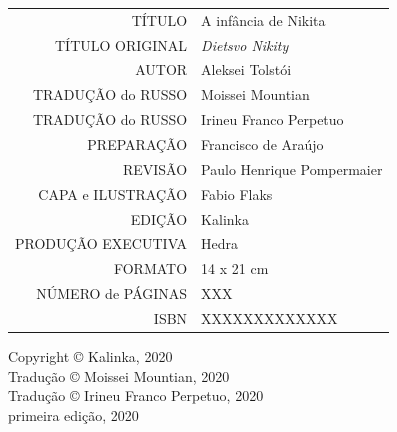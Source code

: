 {\begin{vplace}[1]
\centering
\textlt
\scriptsize
\begin{tabular}{rl}
TÍTULO            & A infância de Nikita							   \\[2pt]
TÍTULO ORIGINAL   & \textit{Dietsvo Nikity}							   \\[2pt]
AUTOR             & Aleksei Tolstói                          		   \\[2pt]
TRADUÇÃO do RUSSO & Moissei Mountian 				                   \\[2pt]
TRADUÇÃO do RUSSO & Irineu Franco Perpetuo			                   \\[2pt]
PREPARAÇÃO        & Francisco de Araújo                                \\[2pt]
REVISÃO 		  & Paulo Henrique Pompermaier                         \\[2pt] 
CAPA e ILUSTRAÇÃO & Fabio Flaks		                                   \\[2pt]
EDIÇÃO            & Kalinka 		                                   \\[2pt] 
PRODUÇÃO EXECUTIVA & Hedra                                             \\[2pt]
FORMATO           & 14 x 21 cm                                         \\[2pt]
NÚMERO de PÁGINAS & XXX                                                \\[2pt]
ISBN              & XXXXXXXXXXXXX                                 
\end{tabular}
\end{vplace}
\vfill

\begin{center}
\textlt
\scriptsize
Copyright © Kalinka, 2020\\[6pt]

Tradução © Moissei Mountian, 2020\\[6pt]

Tradução © Irineu Franco Perpetuo, 2020\\[6pt]

primeira edição, 2020\\[40pt]



\end{center}}
